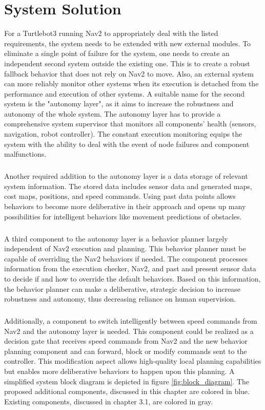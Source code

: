 \section{System Solution}

For a Turtlebot3 running Nav2 to appropriately deal with the listed requirements, the system needs to be extended with new external modules. To eliminate a single point of failure for the system, one needs to create an independent second system outside the existing one. This is to create a robust fallback behavior that does not rely on Nav2 to move. Also, an external system can more reliably monitor other systems when its execution is detached from the performance and execution of other systems. 
A suitable name for the second system is the "autonomy layer", as it aims to increase the robustness and autonomy of the whole system. 
The autonomy layer has to provide a comprehensive system supervisor that monitors all components' health (sensors, navigation, robot controller). The constant execution monitoring equips the system with the ability to deal with the event of node failures and component malfunctions.
\subparagraph*{}
Another required addition to the autonomy layer is a data storage of relevant system information. The stored data includes sensor data and generated maps, cost maps, positions, and speed commands. Using past data points allows behaviors to become more deliberative in their approach and opens up many possibilities for intelligent behaviors like movement predictions of obstacles. 
\subparagraph*{}
A third component to the autonomy layer is a behavior planner largely independent of Nav2 execution and planning. This behavior planner must be capable of overriding the Nav2 behaviors if needed. The component processes information from the execution checker, Nav2, and past and present sensor data to decide if and how to override the default behaviors. Based on this information, the behavior planner can make a deliberative, strategic decision to increase robustness and autonomy, thus decreasing reliance on human supervision.
\subparagraph*{}
Additionally, a component to switch intelligently between speed commands from Nav2 and the autonomy layer is needed. This component could be realized as a decision gate that receives speed commands from Nav2 and the new behavior planning component and can forward, block or modify commands sent to the controller. This modification aspect allows high-quality local planning capabilities but enables more deliberative behaviors to happen upon this planning. A simplified system block diagram is depicted in figure \ref{fig:block_diagram}. The proposed additional components, discussed in this chapter are colored in blue. Existing components, discussed in chapter 3.1, are colored in gray. 


